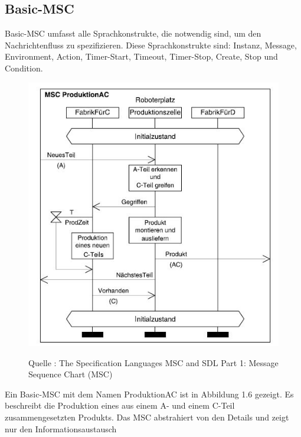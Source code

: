 \subsection{Basic-MSC}
Basic-MSC umfasst alle Sprachkonstrukte, die notwendig sind, um den Nachrichtenfluss zu spezifizieren. Diese
Sprachkonstrukte sind: Instanz, Message, Environment, Action, Timer-Start, Timeout, Timer-Stop, Create, Stop und
Condition.\\

\begin{center}
\begin{figure}[h]
   

\includegraphics[scale=1]{Graphics/MSC1.jpg}



Quelle : The Specification Languages MSC and SDL
Part 1: Message Sequence Chart (MSC) 

 
\label{fig7}


\end{figure}

\end{center}
\newpage
Ein Basic-MSC mit dem Namen ProduktionAC ist in
Abbildung 1.6 gezeigt. Es beschreibt die Produktion eines aus einem
A- und einem C-Teil zusammengesetzten Produkts.
Das MSC abstrahiert von den Details und zeigt nur den Informationsaustausch
